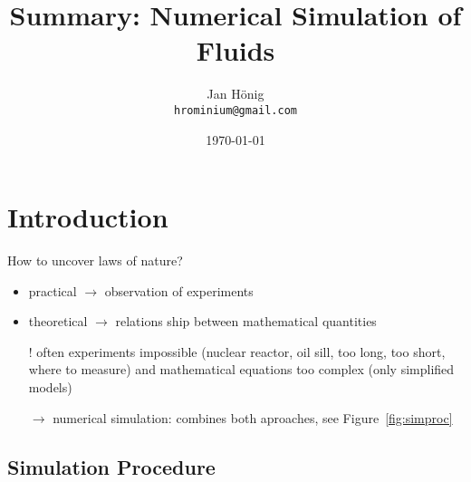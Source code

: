 \documentclass[a4paper,11pt]{scrartcl}
\title{Summary: Numerical Simulation of Fluids}
\author{Jan H\"onig \\ \texttt{hrominium@gmail.com}}
\date{\today}
\begin{document}
\maketitle


\section{Introduction}
How to uncover laws of nature?
\begin{itemize}
	\item practical $\rightarrow$ observation of experiments
	\item theoretical $\rightarrow$ relations ship between mathematical quantities
	\item[!] often experiments impossible (nuclear reactor, oil sill, too long, too short, where to measure) and mathematical equations too complex (only simplified models)
	\item[$\rightarrow$] numerical simulation: combines both aproaches, see Figure~\ref{fig:simproc}
\end{itemize}

\subsection{Simulation Procedure}
\end{document}
